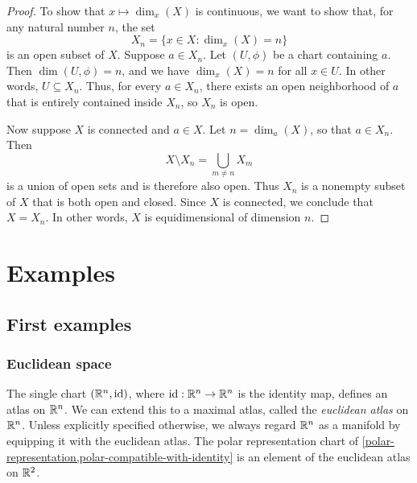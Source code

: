 \begin{proof}
	To show that $x \mapsto \dim_x(X)$ is continuous, we want to show that, for any natural number $n$, the set 
	\[ X_n = \{ x \in X : \dim_x(X) = n \} \]
	is an open subset of $X$. Suppose $a \in  X_n$. Let $(U, \phi)$ be a chart containing $a$. Then $\dim(U,\phi) = n$, and we have $\dim_x(X) = n$ for all $x \in U$. In other words, $U \subseteq X_n$. Thus, for every $a \in X_n$, there exists an open neighborhood of $a$ that is entirely contained inside $X_n$, so $X_n$ is open. 
	
	Now suppose $X$ is connected and $a \in X$. Let $n = \dim_a(X)$, so that $a \in X_n$. Then 
	\[ X \setminus X_n = \bigcup_{m \neq n} X_m \]
	is a union of open sets and is therefore also open. Thus $X_n$ is a nonempty subset of $X$ that is both open and closed. Since $X$ is connected, we conclude that $X = X_n$. In other words, $X$ is equidimensional of dimension $n$. 
\end{proof}

\section{Examples}

\subsection{First examples}

\subsubsection*{Euclidean space}

\begin{example} \label{natural-euclidean-atlas}
	The single chart $(\mathbb{R}^n, \mathrm{id})$, where $\mathrm{id} : \mathbb{R}^n \to \mathbb{R}^n$ is the identity map, defines an atlas on $\mathbb{R}^n$. We can extend this to a maximal atlas, called the \emph{euclidean atlas} on $\mathbb{R}^n$. Unless explicitly specified otherwise, we always regard $\mathbb{R}^n$ as a manifold by equipping it with the euclidean atlas. The polar representation chart of  \cref{polar-representation,polar-compatible-with-identity} is an element of the euclidean atlas on $\mathbb{R}^2$. 
\end{example}

